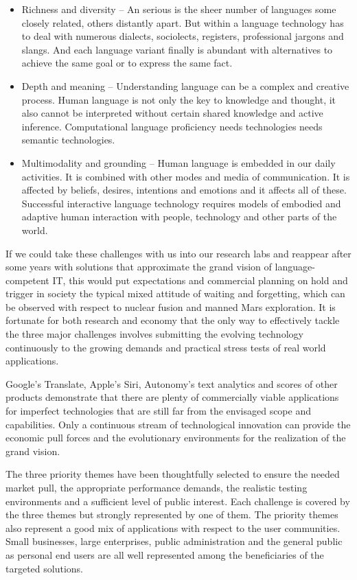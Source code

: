 \begin{multicols}{2}
\begin{itemize}
\item Richness and diversity – An serious is the sheer number of languages some closely related, others distantly apart. But within a language technology has to deal with numerous dialects, sociolects, registers, professional jargons and slangs. And each language variant finally is abundant with alternatives to achieve the same goal or to express the same fact.
\item Depth and meaning  –  Understanding language can be a complex and creative process.  Human language is not only the key to knowledge and thought, it also cannot be interpreted without certain shared knowledge and active inference. Computational language proficiency needs technologies needs semantic technologies.
\item Multimodality and grounding – Human language is embedded in our daily activities. It is combined with other modes and media of communication. It is affected by beliefs, desires, intentions and emotions and it affects all of these. Successful interactive language technology requires models of embodied and adaptive human interaction with people, technology and other parts of the world.
\end{itemize}
 
If we could take these challenges with us into our research labs and reappear after some years with solutions that approximate the grand vision of language-competent IT, this would put expectations and commercial planning on hold and trigger in society the typical mixed attitude of waiting and forgetting, which can be observed with respect to nuclear fusion and manned Mars exploration. It is fortunate for both research and economy that the only way to effectively tackle the three major challenges involves submitting the evolving technology continuously to the growing demands and practical stress tests of real world applications.

Google’s Translate, Apple’s Siri, Autonomy’s text analytics and scores of other products demonstrate that there are plenty of commercially viable applications for imperfect technologies that are still far from the envisaged scope and capabilities. Only a continuous stream of technological innovation can provide the economic pull forces and the evolutionary environments for the realization of the grand vision. 

The three priority themes have been thoughtfully selected to ensure the needed market pull, the appropriate performance demands, the realistic testing environments and a sufficient level of public interest. Each challenge is covered by the three themes but strongly represented by one of them.  The priority themes also represent a good mix of applications with respect to the user communities. Small businesses, large enterprises, public administration and the general public as personal end users are all well represented among the beneficiaries of the targeted solutions.
\end{multicols}

